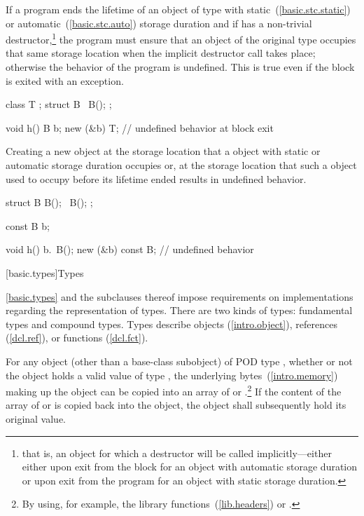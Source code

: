 \pnum
If a program ends the lifetime of an object of type  with
static~(\ref{basic.stc.static}) or automatic~(\ref{basic.stc.auto})
storage duration and if  has a non-trivial destructor,\footnote{that
is, an object for which a destructor will be called
implicitly---either either upon exit from the block for an object with
automatic storage duration or upon exit from the program for an object
with static storage duration.}
the program must ensure that an object of the original type occupies
that same storage location when the implicit destructor call takes
place; otherwise the behavior of the program is undefined. This is true
even if the block is exited with an exception. \enterexample

\begin{codeblock}
class T { };
struct B {
	~B();
};

void h() {
	B b;
	new (&b) T;
}                               // undefined behavior at block exit
\end{codeblock}
\exitexampleb

\pnum
Creating a new object at the storage location that a 
object with static or automatic storage duration occupies or, at the
storage location that such a  object used to occupy before
its lifetime ended results in undefined behavior. \enterexample

\begin{codeblock}
struct B {
	B();
	~B();
};

const B b;

void h() {
	b.~B();
	new (&b) const B;	// undefined behavior
}
\end{codeblock}
\exitexampleb%

[basic.types]{Types}%

\pnum
\enternote
\ref{basic.types} and the subclauses thereof
impose requirements on implementations regarding the representation
of types.
There are two kinds of types: fundamental types and compound types.
Types describe objects (\ref{intro.object}),
references (\ref{dcl.ref}),
or functions (\ref{dcl.fct}).
\exitnote

\pnum
{}%
%
For any object (other than a base-class subobject) of POD type
, whether or not the object holds a valid value of type
, the underlying bytes~(\ref{intro.memory}) making up the
object can be copied into an array of  or 
.\footnote{By using, for example, the library
functions~(\ref{lib.headers})  or .}
If the content of the array of  or 
 is copied back into the object, the object shall
subsequently hold its original value. \enterexample

